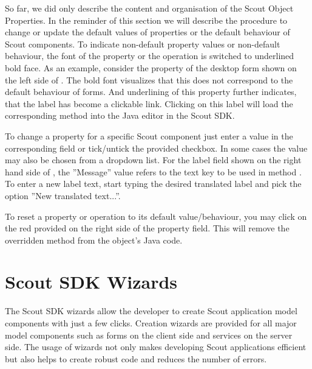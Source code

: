 \documentclass[a4paper,10pt,twoside]{book}
\begin{document}

So far, we did only describe the content and organisation of the Scout Object Properties. 
In the reminder of this section we will describe the procedure to change or update the default values of properties or the default behaviour of Scout components. 
To indicate non-default property values or non-default behaviour, the font of the property or the operation is switched to underlined bold face. 
As an example, consider the property  of the desktop form shown on the left side of . 
The bold font visualizes that this does not correspond to the default behaviour of forms. 
And underlining of this property further indicates, that the label has become a clickable link. 
Clicking on this label will load the corresponding method into the Java editor in the Scout SDK. 

To change a property for a specific Scout component just enter a value in the corresponding field or tick/untick the provided checkbox. 
In some cases the value may also be chosen from a dropdown list. 
For the label field shown on the right hand side of , the ''Message'' value refers to the text key to be used in method . 
To enter a new label text, start typing the desired translated label and pick the option ''New translated text...''. 

To reset a property or operation to its default value/behaviour, you may click on the red  provided on the right side of the property field. 
This will remove the overridden method from the object's Java code. 

\section{Scout SDK Wizards}

The Scout SDK wizards allow the developer to create Scout application model components with just a few clicks. 
Creation wizards are provided for all major model components such as forms on the client side and services on the server side. 
The usage of wizards not only makes developing Scout applications efficient but also helps to create robust code and reduces the number of errors. 
\end{document}
